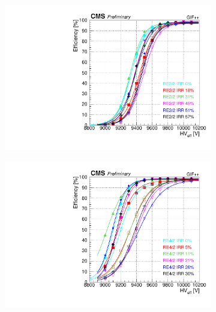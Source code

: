 	\begin{figure}[H]
    	\begin{subfigure}{0.5\linewidth}
			\centering
    		\includegraphics[width = \linewidth]{fig/chapt5/efficiency_vs_HVeff_RE2_2-IRR.pdf}
        	\caption{\label{fig:GIFpp_eff_vs_HVeff:A}}
    	\end{subfigure}
    	\begin{subfigure}{0.5\linewidth}
			\centering
    		\includegraphics[width = \linewidth]{fig/chapt5/efficiency_vs_HVeff_RE4_2-IRR.pdf}
        	\caption{\label{fig:GIFpp_eff_vs_HVeff:B}}
    	\end{subfigure}
    	\begin{subfigure}{0.5\linewidth}
			\centering

\end{subfigure}
\end{figure}
